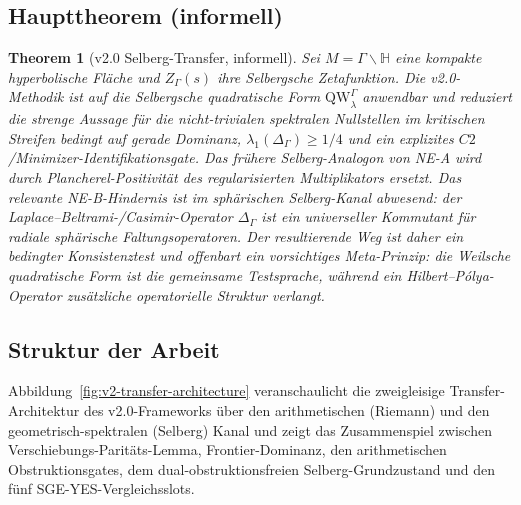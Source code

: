 \documentclass[12pt,a4paper]{article}
\newtheorem{theorem}{Theorem}[section]
\theoremstyle{definition}
\theoremstyle{remark}
\newcommand{\HH}{\mathbb{H}}
\newcommand{\QW}{\mathrm{QW}}
\newcommand{\Sel}{Z_{\Gamma}}
\newcommand{\Delop}{\Delta_{\Gamma}}
\begin{document}
\subsection{Haupttheorem (informell)}

\begin{theorem}[v2.0 Selberg-Transfer, informell]
\label{thm:main-informal}
Sei $M = \Gamma\backslash\HH$ eine kompakte hyperbolische Fläche und
$\Sel(s)$ ihre Selbergsche Zetafunktion. Die v2.0-Methodik ist auf die
Selbergsche quadratische Form $\QW^\Gamma_\lambda$ anwendbar und reduziert die
strenge Aussage für die nicht-trivialen spektralen Nullstellen im kritischen
Streifen bedingt auf gerade Dominanz,
$\lambda_1(\Delop)\ge 1/4$ und ein explizites
$C2$/Minimizer-Identifikationsgate. Das frühere Selberg-Analogon von NE-A
wird durch Plancherel-Positivität des regularisierten Multiplikators ersetzt.
Das relevante NE-B-Hindernis ist im sphärischen Selberg-Kanal abwesend: der
Laplace--Beltrami-/Casimir-Operator $\Delop$ ist ein universeller Kommutant für
radiale sphärische Faltungsoperatoren. Der resultierende Weg ist daher ein
bedingter Konsistenztest und offenbart ein vorsichtiges Meta-Prinzip: die
Weilsche quadratische Form ist die gemeinsame Testsprache, während ein
Hilbert--Pólya-Operator zusätzliche operatorielle Struktur verlangt.
\end{theorem}

\subsection{Struktur der Arbeit}

Abbildung~\ref{fig:v2-transfer-architecture} veranschaulicht die zweigleisige
Transfer-Architektur des v2.0-Frameworks über den arithmetischen (Riemann) und
den geometrisch-spektralen (Selberg) Kanal und zeigt das Zusammenspiel
zwischen Verschiebungs-Paritäts-Lemma, Frontier-Dominanz, den arithmetischen
Obstruktionsgates, dem dual-obstruktionsfreien Selberg-Grundzustand
und den fünf SGE-YES-Vergleichsslots.
\end{document}
